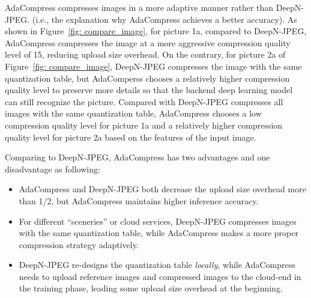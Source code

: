 AdaCompress compresses images in a more adaptive manner rather than DeepN-JPEG. (i.e., the explanation why AdaCompress achieves a better accuracy). As shown in Figure~\ref{fig: compare_image}, for picture 1a, compared to DeepN-JPEG, AdaCompress compresses the image at a more aggressive compression quality level of 15, reducing upload size overhead. On the contrary, for picture 2a of Figure~\ref{fig: compare_image}, DeepN-JPEG compresses the image with the same quantization table, but AdaComperss chooses a relatively higher compression quality level to preserve more details so that the backend deep learning model can still recognize the picture. Compared with DeepN-JPEG compresses all images with the same quantization table, AdaCompress chooses a low compression quality level for picture 1a and a relatively higher compression quality level for picture 2a based on the features of the input image. 


Comparing to DeepN-JPEG, AdaCompress has two advantages and one disadvantage as following: %

\begin{itemize}
	
\item AdaCompress and DeepN-JPEG both decrease the upload size overhead more than 1/2, but AdaCompress maintains higher inference accuracy.

\item For different ``sceneries'' or cloud services, DeepN-JPEG compresses images with the same quantization table, while AdaCompress makes a more proper compression strategy adaptively.

\item DeepN-JPEG re-designs the quantization table \emph{locally}, while AdaCompress needs to upload reference images and compressed images to the cloud-end in the training phase, leading some upload size overhead at the beginning. 
\end{itemize}


